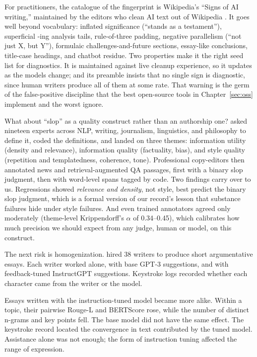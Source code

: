 For practitioners, the catalogue of the fingerprint is Wikipedia's ``Signs
of AI writing,'' maintained by the editors who clean AI text out of Wikipedia
\citep{wikipedia2026signs}. It goes well beyond vocabulary: inflated
significance (``stands as a testament''), superficial \mbox{-ing} analysis
tails, rule-of-three padding, negative parallelism (``not just X, but Y''),
formulaic challenges-and-future sections, essay-like conclusions, title-case
headings, and chatbot residue. Two properties make it the right seed list
for diagnostics. It is maintained against live cleanup experience, so it
updates as the models change; and its preamble insists that no single sign
is diagnostic, since human writers produce all of them at some rate. That
warning is the germ of the false-positive discipline that the best
open-source tools in Chapter~\ref{sec:oss} implement and the worst ignore.

What about ``slop'' as a quality construct rather than an authorship one?
\citet{shaib2025slop} asked nineteen experts across NLP, writing,
journalism, linguistics, and philosophy to define it, coded the definitions,
and landed on three themes: information utility (density and relevance),
information quality (factuality, bias), and style quality (repetition and
templatedness, coherence, tone). Professional copy-editors then annotated
news and retrieval-augmented QA passages, first with a binary slop judgment,
then with word-level spans tagged by code. Two findings carry over to us.
Regressions showed \emph{relevance and density}, not style, best predict the
binary slop judgment, which is a formal version of our record's lesson that
substance failures hide under style failures. And even trained annotators
agreed only moderately (theme-level Krippendorff's $\alpha$ of 0.34--0.45),
which calibrates how much precision we should expect from any judge, human
or model, on this construct.

The next risk is homogenization. \citet{padmakumar2024writing} hired 38 writers
to produce short argumentative essays. Each writer worked alone, with base
GPT-3 suggestions, and with feedback-tuned InstructGPT suggestions. Keystroke
logs recorded whether each character came from the writer or the model.

Essays written with the instruction-tuned model became more alike. Within a
topic, their pairwise Rouge-L and BERTScore rose, while the number of distinct
n-grams and key points fell. The base model did not have the same effect. The
keystroke record located the convergence in text contributed by the tuned
model. Assistance alone was not enough; the form of instruction tuning
affected the range of expression.

